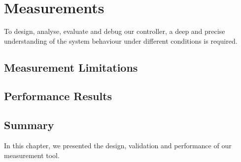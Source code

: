 \chapter{Measurements}
\label{sec:mmeasurement}

To design, analyse, evaluate and debug  our controller,  a deep and precise understanding of the system behaviour under different conditions is required.
%




\section{Measurement Limitations}
\label{sec:measurement:current}
%



%



\section{Performance Results}
\label{sec:results}
%



\section{Summary}

In this chapter, we presented the design, validation and performance of our measurement tool.
%